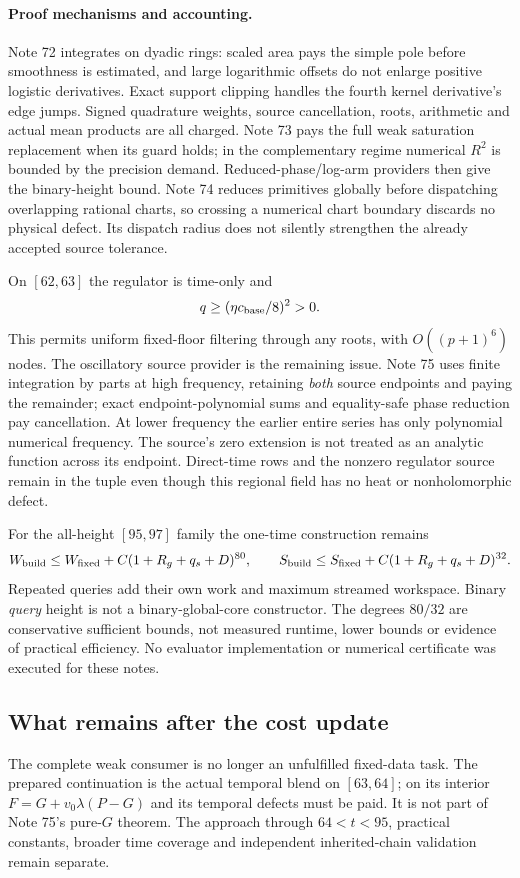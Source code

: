 \paragraph{Proof mechanisms and accounting.}
Note 72 integrates on dyadic rings: scaled area pays the simple pole
before smoothness is estimated, and large logarithmic offsets do not
enlarge positive logistic derivatives. Exact support clipping handles
the fourth kernel derivative's edge jumps. Signed quadrature weights,
source cancellation, roots, arithmetic and actual mean products are
all charged. Note 73 pays the full weak saturation replacement when
its guard holds; in the complementary regime numerical $R^2$ is bounded
by the precision demand. Reduced-phase/log-arm providers then give the
binary-height bound. Note 74 reduces primitives globally before
dispatching overlapping rational charts, so crossing a numerical chart
boundary discards no physical defect. Its dispatch radius does not
silently strengthen the already accepted source tolerance.

On $[62,63]$ the regulator is time-only and
\[
 q\ge(\eta c_{\rm base}/8)^2>0.
\]
This permits uniform fixed-floor filtering through any roots, with
$O((p+1)^6)$ nodes. The oscillatory source provider is the remaining
issue. Note 75 uses finite integration by parts at high frequency,
retaining \emph{both} source endpoints and paying the remainder; exact
endpoint-polynomial sums and equality-safe phase reduction pay
cancellation. At lower frequency the earlier entire series has only
polynomial numerical frequency. The source's zero extension is not
treated as an analytic function across its endpoint. Direct-time rows
and the nonzero regulator source remain in the tuple even though this
regional field has no heat or nonholomorphic defect.

For the all-height $[95,97]$ family the one-time construction remains
\[
 W_{\rm build}\le W_{\rm fixed}+C(1+R_g+q_s+D)^{80},\qquad
 S_{\rm build}\le S_{\rm fixed}+C(1+R_g+q_s+D)^{32}.
\]
Repeated queries add their own work and maximum streamed workspace.
Binary \emph{query} height is not a binary-global-core constructor.
The degrees $80/32$ are conservative sufficient bounds, not measured
runtime, lower bounds or evidence of practical efficiency. No evaluator
implementation or numerical certificate was executed for these notes.

\subsection{What remains after the cost update}
The complete weak consumer is no longer an unfulfilled fixed-data task.
The prepared continuation is the actual temporal blend on $[63,64]$;
on its interior $F=G+v_0\lambda(P-G)$ and its temporal defects must be
paid. It is not part of Note 75's pure-$G$ theorem. The approach through
$64<t<95$, practical constants, broader time coverage and independent
inherited-chain validation remain separate.

